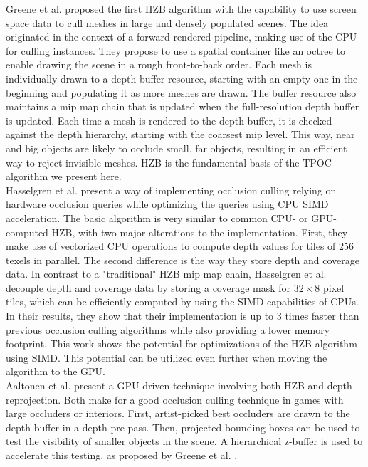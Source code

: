 \documentclass[conference]{IEEEtran}
\begin{document}
\noindent
Greene et al. \cite{b1} proposed the first \ac{HZB} algorithm with the capability to use 
screen space data to cull meshes in large and densely populated scenes. The idea originated 
in the context of a forward-rendered pipeline, making use of the \ac{CPU} for culling instances. 
They propose to use a spatial container like an octree to enable drawing the scene in a rough 
front-to-back order. Each mesh is individually drawn to a depth buffer resource, starting with 
an empty one in the beginning and populating it as more meshes are drawn. The buffer resource 
also maintains a mip map chain that is updated when the full-resolution depth buffer is updated. 
Each time a mesh is rendered to the depth buffer, it is checked against the depth hierarchy, 
starting with the coarsest mip level. This way, near and big objects are likely to occlude small, 
far objects, resulting in an efficient way to reject invisible meshes. \ac{HZB} is the 
fundamental basis of the \ac{TPOC} algorithm we present here.\\

\noindent
Hasselgren et al. \cite{b3} present a way of implementing occlusion culling relying on hardware 
occlusion queries while optimizing the queries using \ac{CPU} \ac{SIMD} acceleration. The basic algorithm 
is very similar to common \ac{CPU}- or \ac{GPU}-computed \ac{HZB}, with two major alterations to the 
implementation. 
First, they make use of vectorized \ac{CPU} operations to compute depth values for tiles of 256 texels 
in parallel. The second difference is the way they store depth and coverage data. In contrast to a 
"traditional" \ac{HZB} mip map chain, Hasselgren et al. decouple depth and coverage data by storing a 
coverage mask for $32 \times 8$ pixel tiles, which can be efficiently computed by using the \ac{SIMD} 
capabilities of \ac{CPU}s. In their results, they show that their implementation is up to 3 times faster 
than previous occlusion culling algorithms while also providing a lower memory footprint. This work shows 
the potential for optimizations of the \ac{HZB} algorithm using \ac{SIMD}. This potential can be utilized 
even further when moving the algorithm to the \ac{GPU}. \\

\noindent
Aaltonen et al. \cite{b4} present a \ac{GPU}-driven technique involving both \ac{HZB} and depth reprojection. 
Both make for a good occlusion culling technique in games with large occluders or interiors. First, 
artist-picked best occluders are drawn to the depth buffer in a depth pre-pass. Then, projected bounding
boxes can be used to test the visibility of smaller objects in the scene. A hierarchical z-buffer is 
used to accelerate this testing, as proposed by Greene et al. \cite{b1}.
\end{document}

